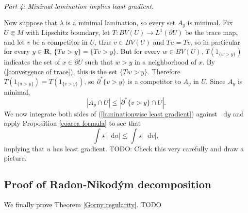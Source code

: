 \documentclass[reqno,10pt]{amsart}
\newcommand{\RR}{\mathbf{R}}
\newcommand*\dif{\mathop{}\!\mathrm{d}}
\theoremstyle{definition}
\newcommand{\proofpart}[2]{%
  \par
  \addvspace{\medskipamount}%
  \noindent\emph{Part #1: #2.}
}
\numberwithin{equation}{section}
\begin{document}
\proofpart{4}{Minimal lamination implies least gradient}
Now suppose that $\lambda$ is a minimal lamination, so every set $A_y$ is minimal.
Fix $U \Subset M$ with Lipschitz boundary, let $T: BV(U) \to L^1(\partial U)$ be the trace map, and let $v$ be a competitor in $U$, thus $v \in BV(U)$ and $Tu = Tv$, so in particular for every $y \in \RR$, $\{Tu > y\} = \{Tv > y\}$.
But for every $w \in BV(U)$, $T(1_{\{w > y\}})$ indicates the set of $x \in \partial U$ such that $w > y$ in a neighborhood of $x$.
By (\ref{convergence of trace}), this is the set $\{Tw > y\}$.
Therefore $T(1_{\{u > y\}}) = T(1_{\{v > y\}})$, so $\partial^* \{v > y\}$ is a competitor to $A_y$ in $U$.
Since $A_y$ is minimal,
\begin{equation}\label{laminationwise least gradient}
|A_y \cap U| \leq |\partial^* \{v > y\} \cap U|.
\end{equation}
We now integrate both sides of (\ref{laminationwise least gradient}) against $\dif y$ and apply Proposition \ref{coarea formula} to see that
$$\int \star |\dif u| \leq \int \star |\dif v|,$$
implying that $u$ has least gradient.
TODO: Check this very carefully and draw a picture.

\subsection{Proof of Radon-Nikod\'ym decomposition}
We finally prove Theorem \ref{Gorny regularity}.
TODO


\printbibliography
\end{document}
